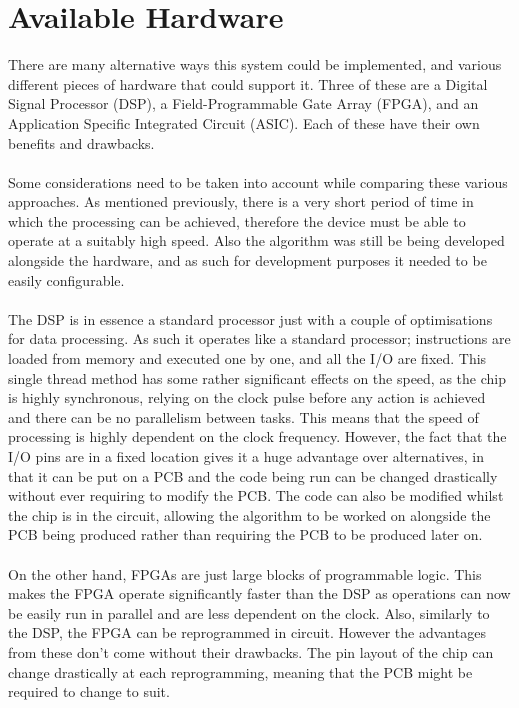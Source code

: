 \section{Available Hardware}
There are many alternative ways this system could be implemented, and various different pieces of hardware that could support it.
Three of these are a Digital Signal Processor (DSP), a Field-Programmable Gate Array (FPGA), and an Application Specific Integrated Circuit (ASIC).
Each of these have their own benefits and drawbacks.
\\
\\
Some considerations need to be taken into account while comparing these various approaches.
As mentioned previously, there is a very short period of time in which the processing can be achieved, therefore the device must be able to operate at a suitably high speed.
Also the algorithm was still be being developed alongside the hardware, and as such for development purposes it needed to be easily configurable.
\\
\\
The DSP is in essence a standard processor just with a couple of optimisations for data processing. 
As such it operates like a standard processor; instructions are loaded from memory and executed one by one, and all the I/O are fixed.
This single thread method has some rather significant effects on the speed, as the chip is highly synchronous, relying on the clock pulse before any action is achieved and there can be no parallelism between tasks.
This means that the speed of processing is highly dependent on the clock frequency.
However, the fact that the I/O pins are in a fixed location gives it a huge advantage over alternatives, in that it can be put on a PCB and the code being run can be changed drastically without ever requiring to modify the PCB.
The code can also be modified whilst the chip is in the circuit, allowing the algorithm to be worked on alongside the PCB being produced rather than requiring the PCB to be produced later on.
\\
\\
On the other hand, FPGAs are just large blocks of programmable logic.
This makes the FPGA operate significantly faster than the DSP as operations can now be easily run in parallel and are less dependent on the clock.
Also, similarly to the DSP, the FPGA can be reprogrammed in circuit.
However the advantages from these don't come without their drawbacks.
The pin layout of the chip can change drastically at each reprogramming, meaning that the PCB might be required to change to suit.
